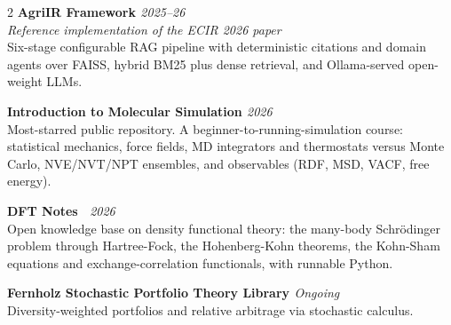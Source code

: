 \documentclass[a4paper,10.5pt]{extarticle}
\newcommand{\entry}[3]{%
  {\normalsize\textbf{#1}}\hfill{\small\itshape\textcolor{mutedtext}{#2}}\\[0.04em]
  {\small #3}\par\vspace{3pt}%
}
\newcommand{\entryv}[4]{%
  {\normalsize\textbf{#1}}\hfill{\small\itshape\textcolor{mutedtext}{#2}}\\[0.04em]
  {\small\itshape\textcolor{mutedtext}{#3}}\\[0.04em]
  {\small #4}\par\vspace{3pt}%
}
\begin{document}
\begin{paracol}{2}
\entryv{AgriIR Framework \href{https://github.com/Shuvam-Banerji-Seal/AgriIR}{\faGithub}}{2025--26}{Reference implementation of the ECIR 2026 paper}{%
Six-stage configurable RAG pipeline with deterministic citations and domain agents over FAISS, hybrid BM25 plus dense retrieval, and Ollama-served open-weight LLMs.}

\entry{Introduction to Molecular Simulation \href{https://github.com/Shuvam-Banerji-Seal/introduction-to-molecular-simulation}{\faGithub}}{2026}{%
Most-starred public repository. A beginner-to-running-simulation course: statistical mechanics, force fields, MD integrators and thermostats versus Monte Carlo, NVE/NVT/NPT ensembles, and observables (RDF, MSD, VACF, free energy).}

\entry{DFT Notes \href{https://github.com/Shuvam-Banerji-Seal/DFT-notes}{\faGithub}~\href{https://shuvam-banerji-seal.github.io/DFT-notes/}{\faGlobe}}{2026}{%
Open knowledge base on density functional theory: the many-body Schr\"odinger problem through Hartree-Fock, the Hohenberg-Kohn theorems, the Kohn-Sham equations and exchange-correlation functionals, with runnable Python.}

\entry{Fernholz Stochastic Portfolio Theory Library \href{https://github.com/XAheli/Fernholz-SPT}{\faGithub}}{Ongoing}{%
Diversity-weighted portfolios and relative arbitrage via stochastic calculus.}


\end{paracol}
\end{document}
